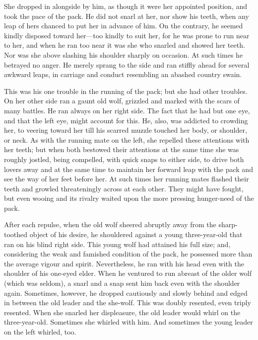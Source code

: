 \documentclass[10pt]{book}
\begin{document}
She dropped in alongside by him, as though it were her appointed
position, and took the pace of the pack. He did not snarl at her, nor
show his teeth, when any leap of hers chanced to put her in advance of
him. On the contrary, he seemed kindly disposed toward her—too kindly
to suit her, for he was prone to run near to her, and when he ran too
near it was she who snarled and showed her teeth. Nor was she above
slashing his shoulder sharply on occasion. At such times he betrayed no
anger. He merely sprang to the side and ran stiffly ahead for several
awkward leaps, in carriage and conduct resembling an abashed country
swain.

This was his one trouble in the running of the pack; but she had other
troubles. On her other side ran a gaunt old wolf, grizzled and marked
with the scars of many battles. He ran always on her right side. The
fact that he had but one eye, and that the left eye, might account for
this. He, also, was addicted to crowding her, to veering toward her
till his scarred muzzle touched her body, or shoulder, or neck. As with
the running mate on the left, she repelled these attentions with her
teeth; but when both bestowed their attentions at the same time she was
roughly jostled, being compelled, with quick snaps to either side, to
drive both lovers away and at the same time to maintain her forward
leap with the pack and see the way of her feet before her. At such
times her running mates flashed their teeth and growled threateningly
across at each other. They might have fought, but even wooing and its
rivalry waited upon the more pressing hunger-need of the pack.

After each repulse, when the old wolf sheered abruptly away from the
sharp-toothed object of his desire, he shouldered against a young
three-year-old that ran on his blind right side. This young wolf had
attained his full size; and, considering the weak and famished
condition of the pack, he possessed more than the average vigour and
spirit. Nevertheless, he ran with his head even with the shoulder of
his one-eyed elder. When he ventured to run abreast of the older wolf
(which was seldom), a snarl and a snap sent him back even with the
shoulder again. Sometimes, however, he dropped cautiously and slowly
behind and edged in between the old leader and the she-wolf. This was
doubly resented, even triply resented. When she snarled her
displeasure, the old leader would whirl on the three-year-old.
Sometimes she whirled with him. And sometimes the young leader on the
left whirled, too.
\end{document}
